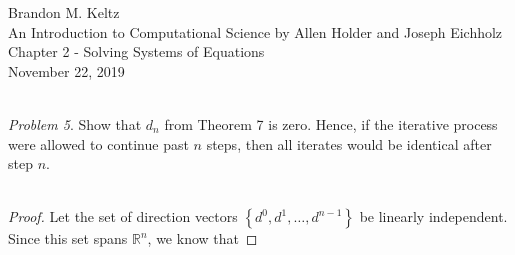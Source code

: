 \documentclass{article}
\begin{document}
	
	\begin{flushleft}	
	
		Brandon M. Keltz\\
		An Introduction to Computational Science by Allen Holder and Joseph Eichholz\\
		Chapter 2 - Solving Systems of Equations\\
		November 22, 2019\\\
		
		\textit{Problem 5}. Show that $d_n$ from Theorem 7 is zero. Hence, if the iterative process were allowed to continue past $n$ steps, then all iterates would be identical after step $n$. \\\
		
		\begin{proof}
		
			Let the set of direction vectors $\left\{ d^0, d^1, \ldots, d^{n - 1} \right\}$ be linearly independent. Since this set spans $\mathbb{R}^n$, we know that
		
		\end{proof}
	
	\end{flushleft}
	
\end{document}
